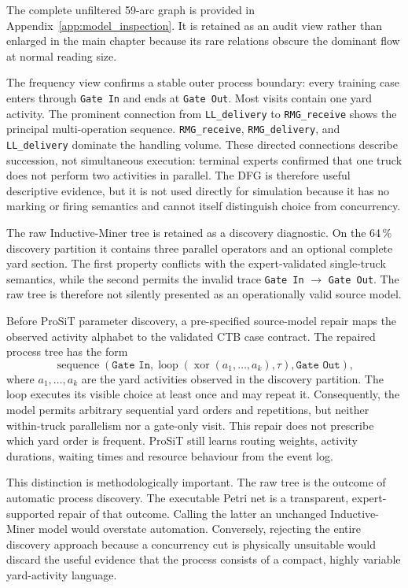 The complete unfiltered 59-arc graph is provided in
Appendix~\ref{app:model_inspection}. It is retained as an audit view rather
than enlarged in the main chapter because its rare relations obscure the
dominant flow at normal reading size.

The frequency view confirms a stable outer process boundary: every training
case enters through \texttt{Gate In} and ends at \texttt{Gate Out}. Most visits
contain one yard activity. The prominent connection from
\texttt{LL\_delivery} to \texttt{RMG\_receive} shows the principal
multi-operation sequence.
\texttt{RMG\_receive}, \texttt{RMG\_delivery}, and \texttt{LL\_delivery}
dominate the handling volume. These directed connections describe succession,
not simultaneous execution: terminal experts confirmed that one truck does
not perform two activities in parallel. The DFG is therefore useful
descriptive evidence, but it is not used directly for simulation because it
has no marking or firing semantics and cannot itself distinguish choice from
concurrency.

The raw Inductive-Miner tree is retained as a discovery diagnostic. On the
64\,\% discovery partition it contains three parallel operators and an
optional complete yard section. The first property conflicts with the
expert-validated single-truck semantics, while the second permits the invalid
trace \texttt{Gate In} $\rightarrow$ \texttt{Gate Out}. The raw tree is
therefore not silently presented as an operationally valid source model.

Before ProSiT parameter discovery, a pre-specified source-model repair maps the
observed activity alphabet to the validated CTB case contract. The repaired
process tree has the form
\begin{equation}
\operatorname{sequence}\!\left(
\texttt{Gate In},
\operatorname{loop}\!\left(
\operatorname{xor}(a_1,\ldots,a_k),\tau
\right),
\texttt{Gate Out}
\right),
\label{eq:ctb_control_flow_contract}
\end{equation}
where $a_1,\ldots,a_k$ are the yard activities observed in the discovery
partition. The loop executes its visible choice at least once and may repeat
it. Consequently, the model permits arbitrary sequential yard orders and
repetitions, but neither within-truck parallelism nor a gate-only visit. This
repair does not prescribe which yard order is frequent. ProSiT still learns
routing weights, activity durations, waiting times and resource behaviour from
the event log.

This distinction is methodologically important. The raw tree is the outcome
of automatic process discovery. The executable Petri net is a transparent,
expert-supported repair of that outcome. Calling the latter an unchanged
Inductive-Miner model would overstate automation. Conversely, rejecting the
entire discovery approach because a concurrency cut is physically unsuitable
would discard the useful evidence that the process consists of a compact,
highly variable yard-activity language.

